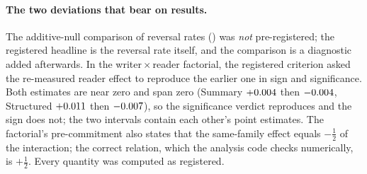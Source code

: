 \paragraph{The two deviations that bear on results.} The additive-null
comparison of reversal rates () was \emph{not} pre-registered;
the registered headline is the reversal rate itself, and the comparison is a
diagnostic added afterwards. In the writer\,$\times$\,reader factorial, the
registered criterion asked the re-measured reader effect to reproduce the
earlier one in sign and significance. Both estimates are near zero and span
zero (Summary $+0.004$ then $-0.004$, Structured
$+0.011$ then $-0.007$), so the significance verdict reproduces
and the sign does not; the two intervals contain each other's point estimates.
The factorial's pre-commitment also states that the same-family effect equals
$-\tfrac12$ of the interaction; the correct relation, which the analysis code
checks numerically, is $+\tfrac12$. Every quantity was computed as registered.

